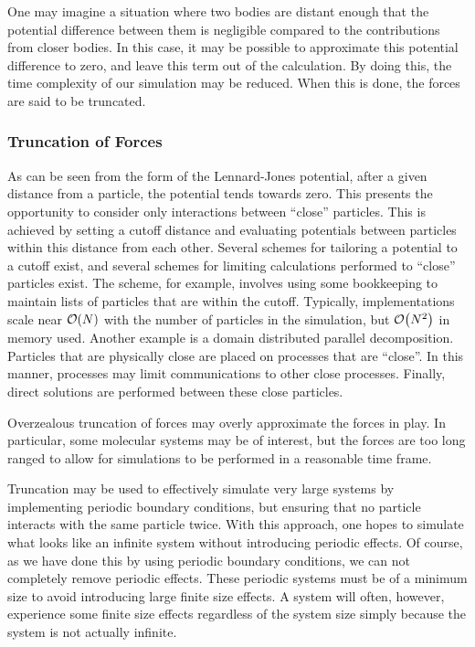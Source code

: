 %
One may imagine a situation where two bodies are distant enough
that the potential difference between them is negligible compared
to the contributions from closer bodies.
%
In this case, it may be possible to approximate this potential difference
to zero, and leave this term out of the calculation.
%
By doing this, the time complexity of our simulation may be reduced.
%
When this is done, the forces are said to be truncated.


\subsubsection{Truncation of Forces}
%
As can be seen from the form of the Lennard-Jones potential,
after a given distance from a particle, the potential tends towards
zero.
%
This presents the opportunity to consider only interactions between
``close'' particles.
%
This is achieved by setting a cutoff distance and evaluating potentials
between particles within this distance from each other.
%
Several schemes for tailoring a potential to a cutoff exist, and several
schemes for limiting calculations performed to ``close'' particles
exist.
%
The \verletlist{} scheme, for example, involves using some bookkeeping to
maintain lists of particles that are within the cutoff.
%
Typically, \verletlist{} implementations scale near $\mathcal{O}{\left({ N }\right)}$ with the
number of particles in the simulation, but $\mathcal{O}{\left({ N^2 }\right)}$ in memory used.
%
Another example is a domain distributed parallel decomposition.
%
Particles that are physically close are placed on processes that are ``close''.
%
In this manner, processes may limit communications to other close processes.
%
Finally, direct solutions are performed between these close particles.

%
Overzealous truncation of forces may overly approximate the forces in play.
%
In particular, some molecular systems may be of interest, but the forces
are too long ranged to allow for simulations to be performed in
a reasonable time frame.

%
Truncation may be used to effectively simulate very large
systems by implementing periodic boundary conditions, but ensuring
that no particle interacts with the same particle twice.
%
With this approach, one hopes to simulate what looks like an infinite system
without introducing periodic effects.
%
Of course, as we have done this by using periodic boundary conditions,
we can not completely remove periodic effects.
%
These periodic systems must be of a minimum size to avoid introducing
large finite size effects.
%
A system will often, however, experience some finite size effects
regardless of the system size simply because the system is not actually
infinite.

